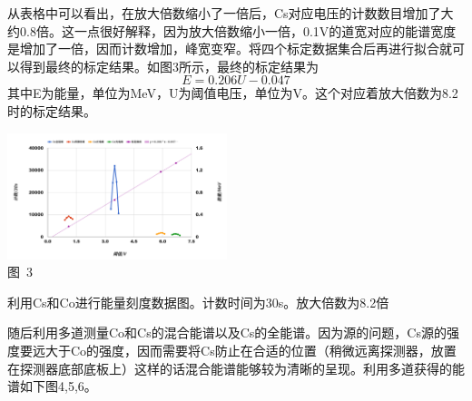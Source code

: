 \documentclass[a4paper,10.0pt,twoside]{npr}
\begin{document}
\begin{multicols}{2}
从表格中可以看出，在放大倍数缩小了一倍后，Cs对应电压的计数数目增加了大约0.8倍。这一点很好解释，因为放大倍数缩小一倍，0.1V的道宽对应的能谱宽度是增加了一倍，因而计数增加，峰宽变窄。将四个标定数据集合后再进行拟合就可以得到最终的标定结果。如图3所示，最终的标定结果为
\begin{equation}
   E = 0.206 U - 0.047 
\end{equation}
其中E为能量，单位为MeV，U为阈值电压，单位为V。这个对应着放大倍数为8.2时的标定结果。

\begin{center}
   \includegraphics[width=0.48\textwidth]{ALLINONE.png}
\\
\xiaowu\song 图~3\begin{minipage}[t]{75mm} \quad 利用Cs和Co进行能量刻度数据图。计数时间为30s。放大倍数为8.2倍\\[-1mm]\wuhao
\end{minipage}
\end{center}

随后利用多道测量Co和Cs的混合能谱以及Cs的全能谱。因为源的问题，Cs源的强度要远大于Co的强度，因而需要将Cs防止在合适的位置（稍微远离探测器，放置在探测器底部底板上）这样的话混合能谱能够较为清晰的呈现。利用多道获得的能谱如下图4,5,6。


\end{multicols}
\end{document}
